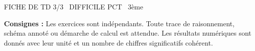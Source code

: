 \documentclass[11pt]{article}
\begin{document}
\begin{tcolorbox}[enhanced,colback=popink,colframe=popink,arc=10pt,boxrule=0pt,left=12pt,right=12pt,top=9pt,bottom=9pt]
{\color{white}\popxbold\small FICHE DE TD 3/3 \textbullet\ DIFFICILE \hfill PCT \textbullet\ 3ème\par}
\end{tcolorbox}
\vspace{4pt}
\noindent \textbf{Consignes :} Les exercices sont indépendants. Toute trace de raisonnement, schéma annoté ou démarche de calcul est attendue. Les résultats numériques sont donnés avec leur unité et un nombre de chiffres significatifs cohérent.
\end{document}
